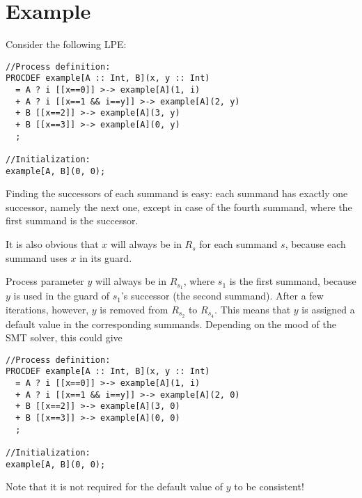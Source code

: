 \clearpage
\section{Example}

Consider the following LPE:

\begin{lstlisting}
//Process definition:
PROCDEF example[A :: Int, B](x, y :: Int)
  = A ? i [[x==0]] >-> example[A](1, i)
  + A ? i [[x==1 && i==y]] >-> example[A](2, y)
  + B [[x==2]] >-> example[A](3, y)
  + B [[x==3]] >-> example[A](0, y)
  ;

//Initialization:
example[A, B](0, 0);
\end{lstlisting}

Finding the successors of each summand is easy: each summand has exactly one successor, namely the next one, except in case of the fourth summand, where the first summand is the successor.

It is also obvious that $x$ will always be in $R_s$ for each summand $s$, because each summand uses $x$ in its guard.

Process parameter $y$ will always be in $R_{s_1}$, where $s_1$ is the first summand, because $y$ is used in the guard of $s_1$'s successor (the second summand).
After a few iterations, however, $y$ is removed from $R_{s_2}$ to $R_{s_4}$.
This means that $y$ is assigned a default value in the corresponding summands.
Depending on the mood of the SMT solver, this could give

\begin{lstlisting}
//Process definition:
PROCDEF example[A :: Int, B](x, y :: Int)
  = A ? i [[x==0]] >-> example[A](1, i)
  + A ? i [[x==1 && i==y]] >-> example[A](2, 0)
  + B [[x==2]] >-> example[A](3, 0)
  + B [[x==3]] >-> example[A](0, 0)
  ;

//Initialization:
example[A, B](0, 0);
\end{lstlisting}

Note that it is not required for the default value of $y$ to be consistent!

